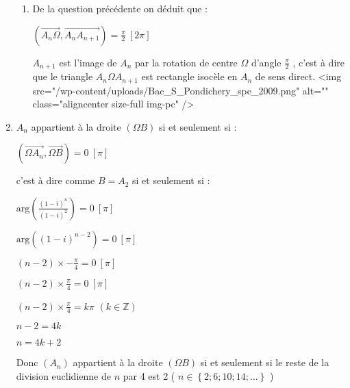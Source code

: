 \begin{corrige}
\begin{enumerate}
\begin{enumerate}[label=\alph*.]
               \item
               De la question précédente on déduit que :
               \par
               $\left(\overrightarrow{A_{n} \Omega }, \overrightarrow{A_{n}A_{n+1}}\right)=\frac{\pi }{2}\ \left[2\pi \right]$
               \par
               $A_{n+1}$ est l'image de $A_{n}$ par la rotation de centre $\Omega $ d'angle $\frac{\pi }{2}$ , c'est à dire que le triangle $A_{n} \Omega  A_{n+1}$ est rectangle isocèle en $A_{n}$ de sens direct.
               <img src="/wp-content/uploads/Bac_S_Pondichery_spe_2009.png" alt="" class="aligncenter size-full  img-pc" />

\begin{center}
\end{center}
          \end{enumerate}
          \item
          $A_{n}$ appartient à la droite $\left(\Omega  B\right)$ si et seulement si :
          \par
          $\left(\overrightarrow{\Omega  A_{n}}, \overrightarrow{\Omega  B}\right)=0 \ \left[\pi \right]$
          \par
          c'est à dire comme $B=A_{2}$ si et seulement si :
          \par
          $\text{arg}\left(\frac{\left(1-i\right)^{n}}{\left(1-i\right)^{2}}\right)=0\ \left[\pi \right]$
          \par
          $\text{arg}\left(\left(1-i\right)^{n-2}\right)=0\ \left[\pi \right]$
          \par
          $\left(n-2\right)\times -\frac{\pi }{4}=0\ \left[\pi \right]$
          \par
          $\left(n-2\right)\times \frac{\pi }{4}=0\ \left[\pi \right]$
          \par
          $\left(n-2\right)\times \frac{\pi }{4}=k\pi $ $\left(k\in \mathbb{Z}\right)$
          \par
          $n-2=4k$
          \par
          $n=4k+2$
          \par
          Donc $\left(A_{n}\right)$ appartient à la droite $\left(\Omega  B\right)$ si et seulement si le reste de la division euclidienne de $n$ par 4 est 2 ( $ n\in \left\{2; 6; 10; 14; . . .\right\} $ )
     \end{enumerate}
\end{corrige}
